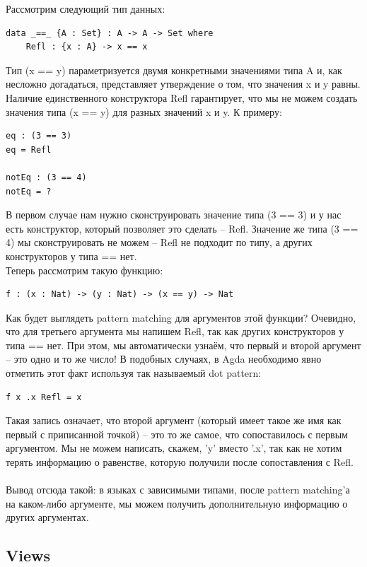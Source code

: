 \documentclass[8pt]{extarticle}
\begin{document}
Рассмотрим следующий тип данных: 
\begin{lstlisting}
data _==_ {A : Set} : A -> A -> Set where
	Refl : {x : A} -> x == x
\end{lstlisting}
Тип (x == y) параметризуется двумя конкретными значениями типа A и, как несложно догадаться, представляет утверждение о том, что значения x и y равны. Наличие единственного конструктора Refl гарантирует, что мы не можем создать значения типа (x == y) для разных значений x и y. К примеру:
\begin{lstlisting}
eq : (3 == 3)
eq = Refl

notEq : (3 == 4)
notEq = ?
\end{lstlisting}
В первом случае нам нужно сконструировать значение типа (3 == 3) и у нас есть конструктор, который позволяет это сделать -- Refl. Значение же типа (3 == 4) мы сконструировать не можем -- Refl не подходит по типу, а других конструкторов у типа == нет.
\\
Теперь рассмотрим такую функцию:
\begin{lstlisting}
f : (x : Nat) -> (y : Nat) -> (x == y) -> Nat
\end{lstlisting}
Как будет выглядеть pattern matching для аргументов этой функции? Очевидно, что для третьего аргумента мы напишем Refl, так как других конструкторов у типа == нет. При этом, мы автоматически узнаём, что первый и второй аргумент -- это одно и то же число! В подобных случаях, в Agda необходимо явно отметить этот факт используя так называемый dot pattern:
\begin{lstlisting}
f x .x Refl = x
\end{lstlisting}
Такая запись означает, что второй аргумент (который имеет такое же имя как первый с приписанной точкой) -- это то же самое, что сопоставилось с первым аргументом. Мы не можем написать, скажем, 'y' вместо '.x', так как не хотим терять информацию о равенстве, которую получили после сопоставления с Refl.\\
\\
Вывод отсюда такой: в языках с зависимыми типами, после pattern matching'а на каком-либо аргументе, мы можем получить дополнительную информацию о других аргументах.


\subsection{Views}
\end{document}
